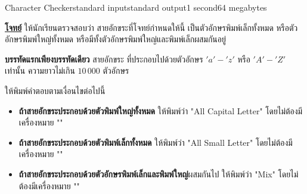 \documentclass[11pt,a4paper]{article}
\begin{document}
\begin{problem}{Character Checker}{standard input}{standard output}{1 second}{64 megabytes}

\underline{\textbf{โจทย์}} ให้นักเรียนตรวจสอบว่า สายอักขระที่โจทย์กำหนดให้นี้ เป็นตัวอักษรพิมพ์เล็กทั้งหมด หรือตัวอักษรพิมพ์ใหญ่ทั้งหมด หรือมีทั้งตัวอักษรพิมพ์ใหญ่และพิมพ์เล็กผสมกันอยู่

\InputFile

\textbf{บรรทัดแรกเพียงบรรทัดเดียว} สายอักขระ ที่ประกอบไปด้วยตัวอักษร $'a' - 'z'$ หรือ $'A' - 'Z'$ เท่านั้น ความยาวไม่เกิน $10\,000$ ตัวอักษร

\OutputFile

ให้พิมพ์คำตอบตามเงื่อนไขต่อไปนี้
\begin{itemize}

    \item \textbf{ถ้าสายอักขระประกอบด้วยตัวพิมพ์ใหญ่ทั้งหมด} ให้พิมพ์ว่า "All Capital Letter" โดยไม่ต้องมีเครื่องหมาย ""
    \item \textbf{ถ้าสายอักขระประกอบด้วยตัวพิมพ์เล็กทั้งหมด} ให้พิมพ์ว่า "All Small Letter" โดยไม่ต้องมีเครื่องหมาย ""
    \item \textbf{ถ้าสายอักขระประกอบด้วยตัวอักษรพิมพ์เล็กและพิมพ์ใหญ่}ผสมกันไป ให้พิมพ์ว่า "Mix" โดยไม่ต้องมีเครื่องหมาย ""
\end{itemize}

\Examples

\begin{example}
%
%
%
\end{example}

\end{problem}
\end{document}
